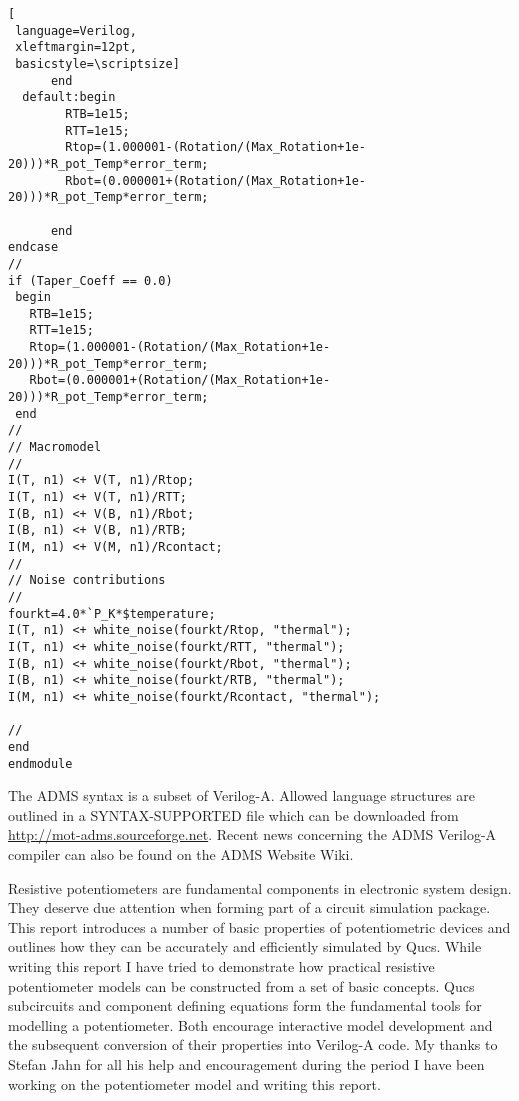 \begin{lstlisting}[
 language=Verilog, 
 xleftmargin=12pt,
 basicstyle=\scriptsize]
      end
  default:begin
        RTB=1e15;
        RTT=1e15;
        Rtop=(1.000001-(Rotation/(Max_Rotation+1e-20)))*R_pot_Temp*error_term;
        Rbot=(0.000001+(Rotation/(Max_Rotation+1e-20)))*R_pot_Temp*error_term;

      end
endcase
//
if (Taper_Coeff == 0.0) 
 begin 
   RTB=1e15;
   RTT=1e15;
   Rtop=(1.000001-(Rotation/(Max_Rotation+1e-20)))*R_pot_Temp*error_term;
   Rbot=(0.000001+(Rotation/(Max_Rotation+1e-20)))*R_pot_Temp*error_term;
 end
//
// Macromodel
//
I(T, n1) <+ V(T, n1)/Rtop;
I(T, n1) <+ V(T, n1)/RTT;
I(B, n1) <+ V(B, n1)/Rbot;
I(B, n1) <+ V(B, n1)/RTB;
I(M, n1) <+ V(M, n1)/Rcontact;
//
// Noise contributions
//
fourkt=4.0*`P_K*$temperature;
I(T, n1) <+ white_noise(fourkt/Rtop, "thermal");
I(T, n1) <+ white_noise(fourkt/RTT, "thermal");
I(B, n1) <+ white_noise(fourkt/Rbot, "thermal");
I(B, n1) <+ white_noise(fourkt/RTB, "thermal");
I(M, n1) <+ white_noise(fourkt/Rcontact, "thermal");

//
end
endmodule
\end{lstlisting}

The ADMS syntax is a subset of Verilog-A.  Allowed language structures
are outlined in a SYNTAX-SUPPORTED file which can be downloaded from
\url{http://mot-adms.sourceforge.net}. Recent news concerning the ADMS
Verilog-A compiler can also be found on the ADMS Website Wiki.

Resistive potentiometers are fundamental components in electronic
system design. They deserve due attention when forming part of a
circuit simulation package.  This report introduces a number of basic
properties of potentiometric devices and outlines how they can be
accurately and efficiently simulated by Qucs. While writing this
report I have tried to demonstrate how practical resistive
potentiometer models can be constructed from a set of basic concepts.
Qucs subcircuits and component defining equations form the fundamental
tools for modelling a potentiometer. Both encourage interactive model
development and the subsequent conversion of their properties into
Verilog-A code.  My thanks to Stefan Jahn for all his help and
encouragement during the period I have been working on the
potentiometer model and writing this report.



